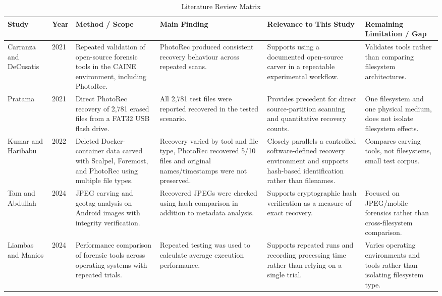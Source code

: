\documentclass[conference]{IEEEtran}
\begin{document}
\begin{table}[t]
\caption{Literature Review Matrix}
\label{tab:lit_matrix}
\centering
\scriptsize
\setlength{\tabcolsep}{2.7pt}
\renewcommand{\arraystretch}{1.14}
\begin{tabularx}{\textwidth}{|p{2.15cm}|C{0.65cm}|>{\raggedright\arraybackslash}X|>{\raggedright\arraybackslash}X|>{\raggedright\arraybackslash}X|>{\raggedright\arraybackslash}X|}
\hline
\textbf{Study} & \textbf{Year} & \textbf{Method / Scope} & \textbf{Main Finding} & \textbf{Relevance to This Study} & \textbf{Remaining Limitation / Gap} \\
\hline
Carranza and DeCusatis \cite{carranza2021daubert} & 2021 & Repeated validation of open-source forensic tools in the CAINE environment, including PhotoRec. & PhotoRec produced consistent recovery behaviour across repeated scans. & Supports using a documented open-source carver in a repeatable experimental workflow. & Validates tools rather than comparing filesystem architectures. \\
\hline
Pratama \cite{pratama2021photorec} & 2021 & Direct PhotoRec recovery of 2,781 erased files from a FAT32 USB flash drive. & All 2,781 test files were reported recovered in the tested scenario. & Provides precedent for direct source-partition scanning and quantitative recovery counts. & One filesystem and one physical medium, does not isolate filesystem effects. \\
\hline
Kumar and Haribabu \cite{kumar2022docker} & 2022 & Deleted Docker-container data carved with Scalpel, Foremost, and PhotoRec using multiple file types. & Recovery varied by tool and file type, PhotoRec recovered 5/10 files and original names/timestamps were not preserved. & Closely parallels a controlled software-defined recovery environment and supports hash-based identification rather than filenames. & Compares carving tools, not filesystems, small test corpus. \\
\hline
Tam and Abdullah \cite{tam2024androidjpeg} & 2024 & JPEG carving and geotag analysis on Android images with integrity verification. & Recovered JPEGs were checked using hash comparison in addition to metadata analysis. & Supports cryptographic hash verification as a measure of exact recovery. & Focused on JPEG/mobile forensics rather than cross-filesystem comparison. \\
\hline
Liambas and Manios \cite{liambas2024performance} & 2024 & Performance comparison of forensic tools across operating systems with repeated trials. & Repeated testing was used to calculate average execution performance. & Supports repeated runs and recording processing time rather than relying on a single trial. & Varies operating environments and tools rather than isolating filesystem type. \\

\end{tabularx}
\end{table}
\end{document}

